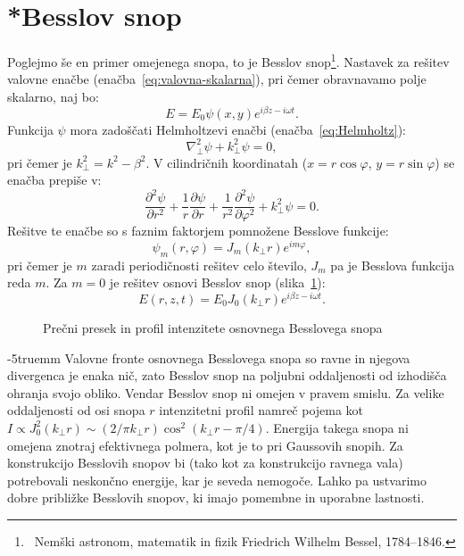 \section{*Besslov snop}
Poglejmo še en primer omejenega snopa, to je Besslov
snop\footnote{~Nemški astronom, matematik in fizik Friedrich Wilhelm Bessel, 1784--1846.}. 
Nastavek za rešitev valovne enačbe (enačba~\ref{eq:valovna-skalarna}), 
pri čemer obravnavamo polje skalarno, naj bo:
\begin{equation}
E=E_{0}\psi(x,y)e^{i\beta z-i\omega t}.
\end{equation}
Funkcija $\psi$ mora zadoščati Helmholtzevi enačbi
(enačba~\ref{eq:Helmholtz}):
\begin{equation}
\nabla_{\perp}^{2}\psi+k_{\perp}^{2}\psi=0,
\end{equation}
pri čemer je $k_{\perp}^{2}=k^{2}-\beta^{2}$. V cilindričnih
koordinatah ($x=r\cos\varphi$, $y=r\sin\varphi$) se enačba prepiše v:
\begin{equation}
\frac{\partial^2 \psi}{\partial r^2}+ \frac{1}{r}\frac{\partial \psi}{\partial r}
+ \frac{1}{r^2}\frac{\partial^2 \psi}{\partial \varphi^2}+k_{\perp}^{2}\psi=0.
\end{equation}
Rešitve te enačbe so s faznim faktorjem pomnožene Besslove funkcije:
\begin{equation}
\psi_m(r, \varphi)=J_{m}(k_{\perp}r)e^{im\varphi},
\end{equation}
pri čemer je $m$ zaradi periodičnosti rešitev
celo število, $J_{m}$ pa je Besslova funkcija reda $m$. Za
$m=0$ je rešitev osnovi Besslov snop (slika~\ref{fig:Besslov_presek}):
\begin{equation}
E(r,z,t)=E_{0}J_{0}(k_{\perp}r)e^{i\beta z-i \omega t}.
\label{eq:Besslov-snop}
\end{equation}
\begin{figure}[ht]
\centering
\def\svgwidth{75truemm} 

\caption{Prečni presek in profil intenzitete osnovnega Besslovega snopa}
\label{fig:Besslov_presek}
\end{figure}
\vglue-5truemm
Valovne fronte osnovnega Besslovega snopa so ravne
 in njegova divergenca je enaka nič, zato Besslov snop na
poljubni oddaljenosti od izhodišča ohranja svojo obliko. Vendar Besslov snop ni 
omejen v pravem smislu. Za velike oddaljenosti od osi snopa $r$ intenzitetni profil 
namreč pojema kot $I \propto J_{0}^{2}(k_{\perp}r)\sim (2/\pi k_{\perp}r)\cos^{2}(k_{\perp}r-\pi/4)$.
Energija takega snopa ni omejena znotraj efektivnega polmera,
kot je to pri Gaussovih snopih. Za konstrukcijo Besslovih snopov
bi (tako kot za konstrukcijo ravnega vala) potrebovali neskončno energije,
kar je seveda nemogoče. Lahko pa ustvarimo dobre približke Besslovih 
snopov, ki imajo pomembne in uporabne lastnosti. 

